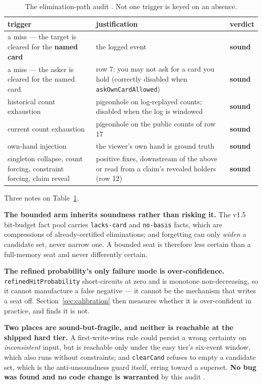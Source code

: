 \documentclass[11pt]{article}
\newcommand{\code}[1]{\texttt{#1}}
\begin{document}
\begin{table}[ht]
\centering
\caption{The elimination-path audit \cite{asking}. Not one trigger is keyed on an
absence.}
\label{tab:audit}
\small
\begin{tabular}{@{}p{} p{} l@{}}
\toprule
trigger & justification & verdict \\
\midrule
a miss --- the target is cleared for the \textbf{named card} & the logged event
& \textbf{sound} \\
a miss --- the asker is cleared for the named card & row 7: you may not ask for a card you
hold (correctly disabled when \code{askOwnCardAllowed}) & \textbf{sound} \\
historical count exhaustion & pigeonhole on log-replayed counts; disabled when the log is
windowed & \textbf{sound} \\
current count exhaustion & pigeonhole on the public counts of row 17 & \textbf{sound} \\
own-hand injection & the viewer's own hand is ground truth & \textbf{sound} \\
singleton collapse, count forcing, constraint forcing, claim reveal & positive fixes,
downstream of the above or read from a claim's revealed holders (row 12) & \textbf{sound}
\\
\bottomrule
\end{tabular}
\end{table}

Three notes on Table~\ref{tab:audit}.

\textbf{The bounded arm inherits soundness rather than risking it.} The v1.5 bit-budget
fact pool \cite{v15paper} carries \code{lacks-card} and \code{no-basis} facts, which are
compressions of already-certified eliminations; and forgetting can only \emph{widen} a
candidate set, never narrow one. A bounded seat is therefore less certain than a
full-memory seat and never differently certain.

\textbf{The refined probability's only failure mode is over-confidence.}
\code{refinedHitProbability} short-circuits at zero and is monotone non-decreasing, so it
cannot manufacture a false negative --- it cannot be the mechanism that writes a seat off.
Section~\ref{sec:calibration} then measures whether it is over-confident in practice, and
finds it is not.

\textbf{Two places are sound-but-fragile, and neither is reachable at the shipped hard
tier.} A first-write-wins rule could persist a wrong certainty on \emph{inconsistent}
input, but is reachable only under the easy tier's six-event window, which also runs
without constraints; and \code{clearCand} refuses to empty a candidate set, which is the
anti-unsoundness guard itself, erring toward a superset. \textbf{No bug was found and no
code change is warranted} by this audit \cite{asking}.
\end{document}
